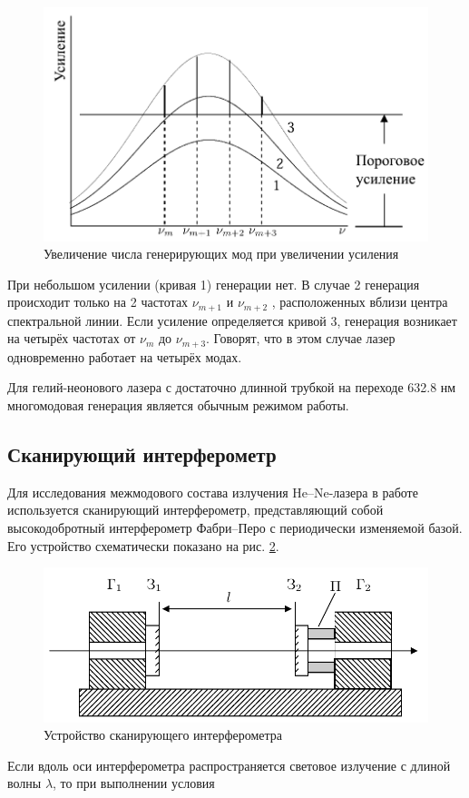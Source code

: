 \begin{figure}[h]
    \center\includegraphics[width = 0.6\linewidth]{multimodes.png}
    \caption{Увеличение числа генерирующих мод при увеличении усиления}\label{fig:multimodes}
\end{figure}

При небольшом усилении (кривая 1) генерации нет. В случае 2 генерация происходит только на 2 частотах $\nu_{m+1}$ и $\nu_{m+2}$ , расположенных вблизи центра спектральной линии. Если усиление определяется кривой 3, генерация возникает на четырёх частотах от $\nu_m$ до $\nu_{m+3}$. Говорят, что в этом случае лазер одновременно работает на четырёх модах.

Для гелий-неонового лазера с достаточно длинной трубкой на переходе 632.8 нм многомодовая генерация является обычным режимом работы.

\subsection{Сканирующий интерферометр}
Для исследования межмодового состава излучения He–Ne-лазера в работе используется сканирующий интерферометр, представляющий собой высокодобротный интерферометр Фабри–Перо с периодически изменяемой базой. Его устройство схематически показано на рис.  \ref{fig:interferometr}.

\newpage

\begin{figure}[h]
    \center\includegraphics[width = 0.6\linewidth]{interferometr.png}
    \caption{Устройство сканирующего интерферометра}\label{fig:interferometr}
\end{figure}

Если вдоль оси интерферометра распространяется световое излучение с длиной волны $\lambda$, то при выполнении условия


